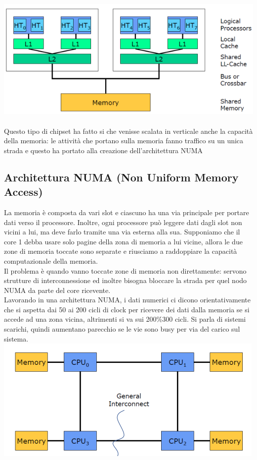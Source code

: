 \documentclass[12pt, oneside]{extbook}
\begin{document}
\includegraphics[scale=0.5]{immagini/smt}\\\\
Questo tipo di chipset ha fatto si che venisse scalata in verticale anche la capacità della memoria: le attività che portano sulla memoria fanno traffico su un unica strada e questo ha portato alla creazione dell'architettura NUMA
\subsection{Architettura NUMA (Non Uniform Memory Access)}
La memoria è composta da vari slot e ciascuno ha una via principale per portare dati verso il processore. Inoltre, ogni processore può leggere dati dagli slot non vicini a lui, ma deve farlo tramite una via esterna alla sua. Supponiamo che il core 1 debba usare solo pagine della zona di memoria a lui vicine, allora le due zone di memoria toccate sono separate e riusciamo a raddoppiare la capacità computazionale della memoria.\\ Il problema è quando vanno toccate zone di memoria non direttamente: servono strutture di interconnessione ed inoltre bisogna bloccare la strada per quel nodo NUMA da parte del core ricevente.\\ Lavorando in una architettura NUMA, i dati numerici ci dicono orientativamente che si aspetta dai 50 ai 200 cicli di clock per ricevere dei dati dalla memoria se si accede ad una zona vicina, altrimenti si va sui 200\%300 cicli. Si parla di sistemi scarichi, quindi aumentano parecchio se le vie sono busy per via del carico sul sistema.\\
\includegraphics[scale=0.5]{immagini/numa}
\end{document}
